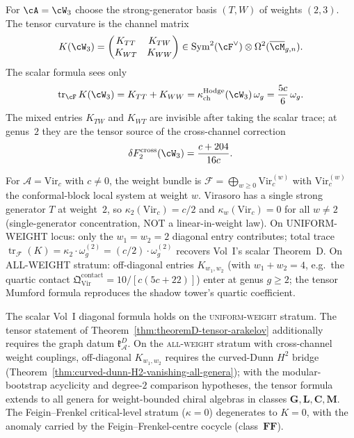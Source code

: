 \begin{example}
\label{ex:theoremD-W3-four-channel-tensor}
For $\cA=\cW_3$ choose the strong-generator basis $(T,W)$ of weights
$(2,3)$. The tensor curvature is the channel matrix
\[
 K(\cW_3)
 =
 \begin{pmatrix}
 K_{TT} & K_{TW}\\
 K_{WT} & K_{WW}
 \end{pmatrix}
 \in
 \operatorname{Sym}^2(\cF^\vee)\otimes
 \Omega^2(\overline{\cM}_{g,n}).
\]
The scalar formula sees only
\[
 \operatorname{tr}_{\cF}K(\cW_3)
 =
 K_{TT}+K_{WW}
 =
 \kappaChHodge(\cW_3)\,\omega_g
 =
 \frac{5c}{6}\,\omega_g.
\]
The mixed entries $K_{TW}$ and $K_{WT}$ are invisible after taking the
scalar trace; at genus~$2$ they are the tensor source of the
cross-channel correction
\[
 \delta F_2^{\mathrm{cross}}(\cW_3)=\frac{c+204}{16c}.
\]
\end{example}

\begin{example}[Virasoro: diagonal tensor curvature for
 UNIFORM-WEIGHT = scalar]
\label{ex:theoremD-virasoro}
For $\mathcal{A} = \mathrm{Vir}_c$ with $c \neq 0$, the weight
bundle is $\mathcal{F} = \bigoplus_{w \ge 0} \mathrm{Vir}_c^{(w)}$
with $\mathrm{Vir}_c^{(w)}$ the conformal-block local system at
weight $w$. Virasoro has a single strong generator $T$ at
weight~$2$, so $\kappa_2(\mathrm{Vir}_c) = c/2$ and
$\kappa_w(\mathrm{Vir}_c) = 0$ for all $w \neq 2$ (single-generator
concentration, NOT a linear-in-weight law).
On UNIFORM-WEIGHT locus: only the $w_1 = w_2 = 2$ diagonal entry
contributes; total trace
$\operatorname{tr}_\mathcal{F}(K) = \kappa_2 \cdot \omega_g^{(2)} =
(c/2) \cdot \omega_g^{(2)}$ recovers Vol~I's scalar Theorem~D. On ALL-WEIGHT stratum: off-diagonal
entries $K_{w_1, w_2}$ (with $w_1 + w_2 = 4$, e.g.\ the quartic
contact $\mathfrak{Q}^{\mathrm{contact}}_{\mathrm{Vir}} =
10/[c(5c+22)]$) enter at genus $g \ge 2$; the tensor Mumford
formula reproduces the shadow tower's quartic coefficient.
\end{example}

\begin{remark}
\label{rem:theoremD-tensor-scope}
The scalar Vol~I diagonal formula holds on the
\textsc{uniform-weight} stratum.  The tensor statement of
Theorem~\ref{thm:theoremD-tensor-arakelov} additionally requires the
graph datum \(\mathfrak k_{\mathcal A}^{D}\). On the
\textsc{all-weight} stratum with cross-channel weight couplings,
off-diagonal $K_{w_1, w_2}$ requires the curved-Dunn $H^2$ bridge
(Theorem~\ref{thm:curved-dunn-H2-vanishing-all-genera}); with the
modular-bootstrap acyclicity and degree-\(2\) comparison
hypotheses, the tensor formula extends to all genera for
weight-bounded chiral algebras in classes
$\mathbf{G}, \mathbf{L}, \mathbf{C}, \mathbf{M}$. The
Feigin--Frenkel critical-level stratum ($\kappa = 0$) degenerates
to $K = 0$, with the anomaly carried by the Feigin--Frenkel-centre
cocycle (class~$\mathbf{FF}$).
\end{remark}

